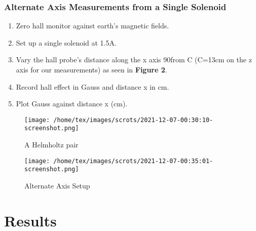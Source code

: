 \documentclass{article}
\begin{document}
   \subsubsection{Alternate Axis Measurements from a Single Solenoid}
   \begin{enumerate}
       \item Zero hall monitor against earth's magnetic fields.
       \item Set up a single solenoid at 1.5A.
       \item Vary the hall probe's distance along the x axis 90\degree from C (C=13cm on the z axis for our measurements) as seen in \textbf{Figure 2}.
       \item Record hall effect in Gauss and distance x in cm.
       \item Plot Gauss against distance x (cm).
   \end{enumerate}
   \begin{figure}
       \centering
       \texttt{[image: /home/tex/images/scrots/2021-12-07-00:30:10-screenshot.png]}
       \caption{A Helmholtz pair}
   \end{figure}
   \begin{figure}
       \centering
       \texttt{[image: /home/tex/images/scrots/2021-12-07-00:35:01-screenshot.png]}
       \caption{Alternate Axis Setup}
   \end{figure}
   
   \section{Results}
\end{document}
